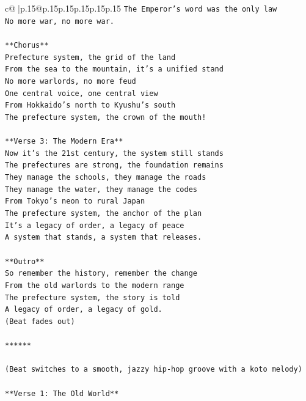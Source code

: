 \documentclass{article}
\begin{document}
{\begin{supertabular}{c@{$\;$}|p{.15\linewidth}@{}p{.15\linewidth}p{.15\linewidth}p{.15\linewidth}p{.15\linewidth}p{.15\linewidth}}
{{{\texttt{The Emperor's word was the only law} \\
\texttt{No more war, no more war.} \\
\\ 
\texttt{**Chorus**} \\
\texttt{Prefecture system, the grid of the land} \\
\texttt{From the sea to the mountain, it's a unified stand} \\
\texttt{No more warlords, no more feud} \\
\texttt{One central voice, one central view} \\
\texttt{From Hokkaido's north to Kyushu's south} \\
\texttt{The prefecture system, the crown of the mouth!} \\
\\ 
\texttt{**Verse 3: The Modern Era**} \\
\texttt{Now it's the 21st century, the system still stands} \\
\texttt{The prefectures are strong, the foundation remains} \\
\texttt{They manage the schools, they manage the roads} \\
\texttt{They manage the water, they manage the codes} \\
\texttt{From Tokyo's neon to rural Japan} \\
\texttt{The prefecture system, the anchor of the plan} \\
\texttt{It's a legacy of order, a legacy of peace} \\
\texttt{A system that stands, a system that releases.} \\
\\ 
\texttt{**Outro**} \\
\texttt{So remember the history, remember the change} \\
\texttt{From the old warlords to the modern range} \\
\texttt{The prefecture system, the story is told} \\
\texttt{A legacy of order, a legacy of gold.} \\
\texttt{(Beat fades out)} \\
\\ 
\texttt{******} \\
\\ 
\texttt{(Beat switches to a smooth, jazzy hip{-}hop groove with a koto melody)} \\
\\ 
\texttt{**Verse 1: The Old World**} \\
}}}
\end{supertabular}}
\end{document}
